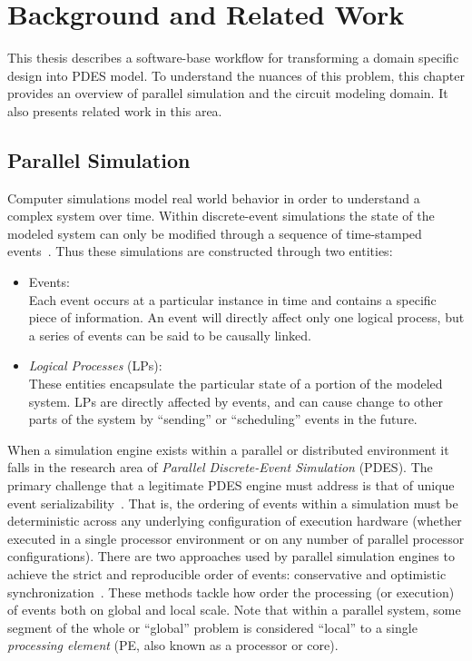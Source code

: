 \chapter{Background and Related Work}
\label{chapt:bg}


This thesis describes a software-base workflow for transforming a domain specific design into PDES model.
To understand the nuances of this problem, this chapter provides an overview of parallel simulation and the circuit modeling domain.
It also presents related work in this area.

\section{Parallel Simulation}

Computer simulations model real world behavior in order to understand a complex system over time.
Within discrete-event simulations the state of the modeled system can only be modified through a sequence of time-stamped events~\cite{book:simulation}.
Thus these simulations are constructed through two entities:
\begin{itemize}
	\item Events:\\
		  Each event occurs at a particular instance in time and contains a specific piece of information.
		  An event will directly affect only one logical process, but a series of events can be said to be causally linked.
	\item \textit{Logical Processes} (LPs):\\
		  These entities encapsulate the particular state of a portion of the modeled system.
		  LPs are directly affected by events, and can cause change to other parts of the system by ``sending'' or ``scheduling'' events in the future.
\end{itemize}


When a simulation engine exists within a parallel or distributed environment it falls in the research area of \textit{Parallel Discrete-Event Simulation} (PDES).
The primary challenge that a legitimate PDES engine must address is that of unique event serializability~\cite{Fujimoto:2000fk}.
That is, the ordering of events within a simulation must be deterministic across any underlying configuration of execution hardware (whether executed in a single processor environment or on any number of parallel processor configurations).
There are two approaches used by parallel simulation engines to achieve the strict and reproducible order of events: conservative and optimistic synchronization~\cite{Fujimoto:2000fk}.
These methods tackle how order the processing (or execution) of events both on global and local scale.
Note that within a parallel system, some segment of the whole or ``global'' problem is considered ``local'' to a single \textit{processing element} (PE, also known as a processor or core).

